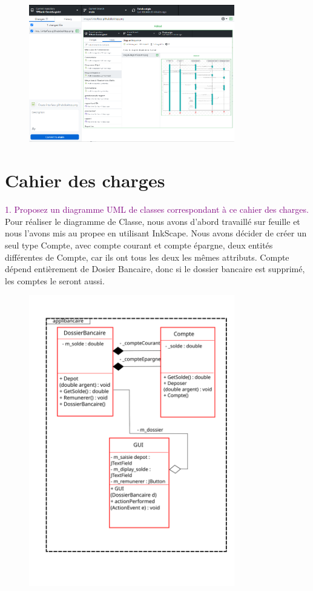 \documentclass{article}
\begin{document}
\begin{figure}[h]
\includegraphics[width=0.8\textwidth]{Interface GithubDesktop 2}
\end{figure}

\newpage
\section{Cahier des charges}


\textcolor{Purple}{1. Proposez un diagramme UML de classes correspondant à ce cahier des charges.}
\newline
Pour réaliser le diagramme de Classe, nous avons d'abord travaillé sur feuille et nous l'avons mis au propee en utilisant InkScape. 
Nous avons décider de créer un seul type Compte, avec compte courant et compte épargne, deux entités différentes de Compte, car ils ont tous les deux les mêmes attributs.
Compte dépend entièrement de Dosier Bancaire, donc si le dossier bancaire est supprimé, les comptes le seront aussi.
\begin{figure}[h]
\includegraphics[width=0.8\textwidth]{diagrammeClasse.png}
\end{figure}
\newline
\newpage
\end{document}
